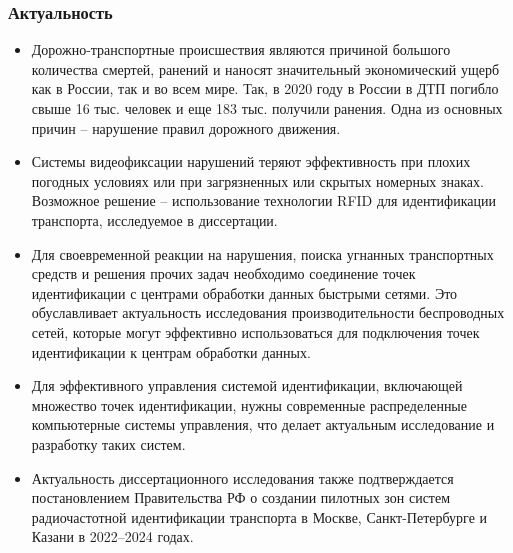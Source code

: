 \begin{frame}
    \setcounter{framenumber}{1}
    \maketitle
\end{frame}

\begin{frame}
    \frametitle{Актуальность}
    \footnotesize
    \begin{itemize}
        \item Дорожно-транспортные происшествия являются причиной большого количества смертей, ранений и наносят значительный экономический ущерб как в России, так и во всем мире. Так, в 2020 году в России в ДТП погибло свыше 16 тыс. человек и еще 183 тыс. получили ранения. Одна из основных причин -- нарушение правил дорожного движения.
        \item Системы видеофиксации нарушений теряют эффективность при плохих погодных условиях или при загрязненных или скрытых номерных знаках. Возможное решение -- использование технологии RFID для идентификации транспорта, исследуемое в диссертации.
        \item Для своевременной реакции на нарушения, поиска угнанных транспортных средств и решения прочих задач необходимо соединение точек идентификации с центрами обработки данных быстрыми сетями. Это обуславливает актуальность исследования производительности беспроводных сетей, которые могут эффективно использоваться для подключения точек идентификации к центрам обработки данных.
        \item Для эффективного управления системой идентификации, включающей множество точек идентификации, нужны современные распределенные компьютерные системы управления, что делает актуальным исследование и разработку таких систем.
        \item Актуальность диссертационного исследования также подтверждается постановлением Правительства РФ о создании пилотных зон систем радиочастотной идентификации транспорта в Москве, Санкт-Петербурге и Казани в 2022--2024 годах.
    \end{itemize}
\end{frame}

